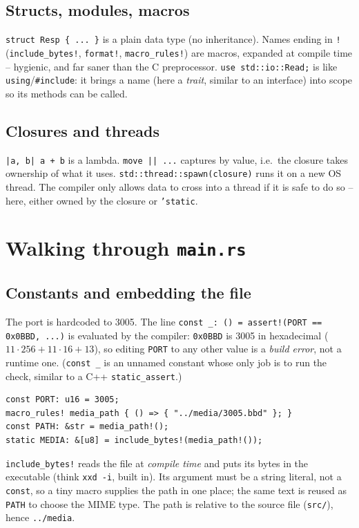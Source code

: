 \documentclass[11pt]{article}
\begin{document}
\subsection{Structs, modules, macros}
\texttt{struct Resp \{ ... \}} is a plain data type (no inheritance). Names ending in \texttt{!} (\texttt{include\_bytes!}, \texttt{format!}, \texttt{macro\_rules!}) are macros, expanded at compile time -- hygienic, and far saner than the C preprocessor. \texttt{use std::io::Read;} is like \texttt{using}/\texttt{\#include}: it brings a name (here a \emph{trait}, similar to an interface) into scope so its methods can be called.

\subsection{Closures and threads}
\texttt{|a, b| a + b} is a lambda. \texttt{move || ...} captures by value, i.e.\ the closure takes ownership of what it uses. \texttt{std::thread::spawn(closure)} runs it on a new OS thread. The compiler only allows data to cross into a thread if it is safe to do so -- here, either owned by the closure or \texttt{'static}.

\section{Walking through \texttt{main.rs}}
\subsection{Constants and embedding the file}
The port is hardcoded to 3005. The line \texttt{const \_: () = assert!(PORT == 0x0BBD, ...)} is evaluated by the compiler: \texttt{0x0BBD} is 3005 in hexadecimal ($11\cdot256+11\cdot16+13$), so editing \texttt{PORT} to any other value is a \emph{build error}, not a runtime one. (\texttt{const \_} is an unnamed constant whose only job is to run the check, similar to a C++ \texttt{static\_assert}.)

\begin{lstlisting}
const PORT: u16 = 3005;
macro_rules! media_path { () => { "../media/3005.bbd" }; }
const PATH: &str = media_path!();
static MEDIA: &[u8] = include_bytes!(media_path!());
\end{lstlisting}
\texttt{include\_bytes!} reads the file at \emph{compile time} and puts its bytes in the executable (think \texttt{xxd -i}, built in). Its argument must be a string literal, not a \texttt{const}, so a tiny macro supplies the path in one place; the same text is reused as \texttt{PATH} to choose the MIME type. The path is relative to the source file (\texttt{src/}), hence \texttt{../media}.
\end{document}
